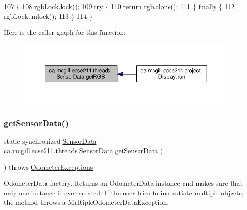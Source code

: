 \begin{DoxyCode}
107                         \{
108     rgbLock.lock();
109     \textcolor{keywordflow}{try} \{
110       \textcolor{keywordflow}{return} rgb.clone();
111     \} \textcolor{keywordflow}{finally} \{
112       rgbLock.unlock();
113     \}
114   \}
\end{DoxyCode}
Here is the caller graph for this function\+:\nopagebreak
\begin{figure}[H]
\begin{center}
\leavevmode
\includegraphics[width=350pt]{classca_1_1mcgill_1_1ecse211_1_1threads_1_1_sensor_data_a76313564e284f5cdb66aefce4e595f3b_icgraph}
\end{center}
\end{figure}
\mbox{\label{classca_1_1mcgill_1_1ecse211_1_1threads_1_1_sensor_data_a8260aba53b4474ca1275e4ce26157977}} 
\subsubsection{\texorpdfstring{get\+Sensor\+Data()}{getSensorData()}}
{\footnotesize\ttfamily static synchronized \hyperlink{classca_1_1mcgill_1_1ecse211_1_1threads_1_1_sensor_data}{Sensor\+Data} ca.\+mcgill.\+ecse211.\+threads.\+Sensor\+Data.\+get\+Sensor\+Data (\begin{DoxyParamCaption}{ }\end{DoxyParamCaption}) throws \hyperlink{classca_1_1mcgill_1_1ecse211_1_1odometer_1_1_odometer_exceptions}{Odometer\+Exceptions}\hspace{0.3cm}{\ttfamily [static]}}

Odometer\+Data factory. Returns an Odometer\+Data instance and makes sure that only one instance is ever created. If the user tries to instantiate multiple objects, the method throws a Multiple\+Odometer\+Data\+Exception.

